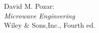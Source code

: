 \newpage\begin{thebibliography}{9}
 David M. Pozar:\\ \emph{Microwave Engineering}\\ Wiley \& Sons,Inc., Fourth ed.
\end{thebibliography}